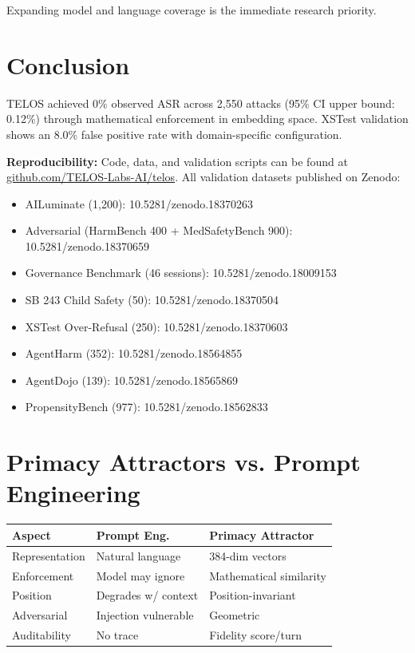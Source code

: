 \documentclass[11pt,twocolumn]{article}
\begin{document}
Expanding model and language coverage is the immediate research priority.

\section{Conclusion}

TELOS achieved 0\% observed ASR across 2,550 attacks (95\% CI upper bound: 0.12\%) through mathematical enforcement in embedding space. XSTest validation shows an 8.0\% false positive rate with domain-specific configuration.

\textbf{Reproducibility:} Code, data, and validation scripts can be found at \url{github.com/TELOS-Labs-AI/telos}. All validation datasets published on Zenodo:
\begin{itemize}
    \item AILuminate (1,200): 10.5281/zenodo.18370263
    \item Adversarial (HarmBench 400 + MedSafetyBench 900): 10.5281/zenodo.18370659
    \item Governance Benchmark (46 sessions): 10.5281/zenodo.18009153
    \item SB 243 Child Safety (50): 10.5281/zenodo.18370504
    \item XSTest Over-Refusal (250): 10.5281/zenodo.18370603
    \item AgentHarm (352): 10.5281/zenodo.18564855
    \item AgentDojo (139): 10.5281/zenodo.18565869
    \item PropensityBench (977): 10.5281/zenodo.18562833
\end{itemize}

\appendix
\section{Primacy Attractors vs. Prompt Engineering}

\begin{table}[h]
\centering
\small
\begin{tabular}{@{}lp{2cm}p{2.5cm}@{}}
\toprule
\textbf{Aspect} & \textbf{Prompt Eng.} & \textbf{Primacy Attractor} \\
\midrule
Representation & Natural language & 384-dim vectors \\
Enforcement & Model may ignore & Mathematical similarity \\
Position & Degrades w/ context & Position-invariant \\
Adversarial & Injection vulnerable & Geometric \\
Auditability & No trace & Fidelity score/turn \\
\bottomrule
\end{tabular}
\end{table}
\end{document}

